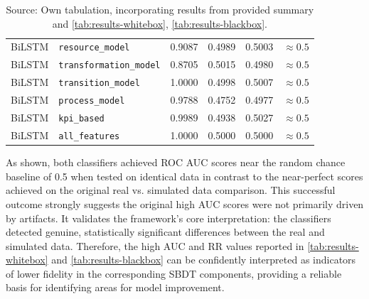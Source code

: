 \begin{table}[htbp]
{\begin{tabular}{l l c c c c}
      BiLSTM              & \texttt{resource\_model}               & 0.9087                  & 0.4989                           & 0.5003                                & $\approx 0.5$            \\
      BiLSTM              & \texttt{transformation\_model}         & 0.8705                  & 0.5015                           & 0.4980                                & $\approx 0.5$            \\
      BiLSTM              & \texttt{transition\_model}             & 1.0000                  & 0.4998                           & 0.5007                                & $\approx 0.5$            \\
      BiLSTM              & \texttt{process\_model}                & 0.9788                  & 0.4752                           & 0.4977                                & $\approx 0.5$            \\
      BiLSTM              & \texttt{kpi\_based}                    & 0.9989                  & 0.4938                           & 0.5027                                & $\approx 0.5$            \\
      BiLSTM              & \texttt{all\_features}                 & 1.0000                  & 0.5000                           & 0.5000                                & $\approx 0.5$            \\
      \bottomrule
    \end{tabular}%
  }
  \caption*{Source: Own tabulation, incorporating results from provided summary and \autoref{tab:results-whitebox}, \autoref{tab:results-blackbox}.}
\end{table}

As shown, both classifiers achieved ROC AUC scores near the random chance baseline of 0.5 when tested on identical data in contrast to the near-perfect scores achieved on the original real vs. simulated data comparison.
This successful outcome strongly suggests the original high AUC scores were not primarily driven by artifacts. It validates the framework's core interpretation: the classifiers detected genuine, statistically significant differences between the real and simulated data. Therefore, the high AUC and RR values reported in \autoref{tab:results-whitebox} and \autoref{tab:results-blackbox} can be confidently interpreted as indicators of lower fidelity in the corresponding SBDT components, providing a reliable basis for identifying areas for model improvement.

